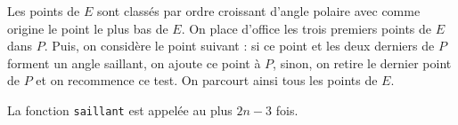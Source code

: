 

\Q
Les points de $E$ sont classés par ordre croissant d'angle polaire avec comme origine le point le plus bas de $E$. On place d'office les trois premiers points de $E$ dans $P$. Puis, on considère le point suivant : si ce point et les deux derniers de $P$ forment un angle saillant, on ajoute ce point à $P$, sinon, on retire le dernier point de $P$ et on recommence ce test. On parcourt ainsi tous les points de $E$.



La fonction \texttt{saillant} est appelée au plus $2n-3$ fois.
\bigskip

\Fin
